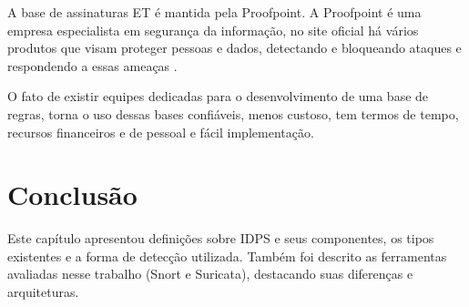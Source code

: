 A base de assinaturas ET é mantida pela Proofpoint. A Proofpoint é uma empresa especialista em segurança da informação, no site oficial há vários produtos que visam proteger pessoas e dados, detectando e bloqueando ataques e respondendo a essas ameaças \cite{et:proofpoint}.

O fato de existir equipes dedicadas para o desenvolvimento de uma base de regras, torna o uso dessas bases confiáveis, menos custoso, tem termos de tempo, recursos financeiros e de pessoal e fácil implementação. 

\section{Conclusão} \label{sec:idps-conclusao}

Este capítulo apresentou definições sobre IDPS e seus componentes, os tipos existentes e a forma de detecção utilizada. Também foi descrito as ferramentas avaliadas nesse trabalho (Snort e Suricata), destacando suas diferenças e arquiteturas.
